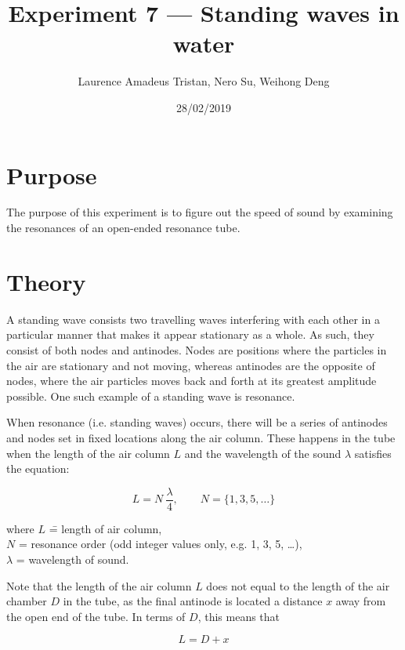 \documentclass{article}
\title{Experiment 7 — Standing waves in water}
\author{Laurence Amadeus Tristan, Nero Su, Weihong Deng}
\date{28/02/2019}
\numberwithin{equation}{section}
\begin{document}
\maketitle

\section{Purpose}
The purpose of this experiment is to figure out the speed of sound by examining the resonances of an open-ended resonance tube.

\section{Theory}
A standing wave consists two travelling waves interfering with each other in a particular manner that makes it appear stationary as a whole. As such, they consist of both nodes and antinodes. Nodes are positions where the particles in the air are stationary and not moving, whereas antinodes are the opposite of nodes, where the air particles moves back and forth at its greatest amplitude possible. One such example of a standing wave is resonance.

When resonance (i.e. standing waves) occurs, there will be a series of antinodes and nodes set in fixed locations along the air column.  These happens in the tube when the length of the air column \(L\) and the wavelength of the sound \(\lambda\) satisfies the equation:

\begin{equation} \label{eq:t1}
  L = N \ \frac{\lambda}{4}, \qquad N = \{1, 3, 5, \ldots\}
\end{equation}

\begin{tabbing}
  where \= \(L\) \= = length of air column, \\
  \> \(N\) \> = resonance order (odd integer values only, e.g. 1, 3, 5, \ldots), \\
  \> \(\lambda\) \> = wavelength of sound.
\end{tabbing}

Note that the length of the air column \(L\) does not equal to the length of the air chamber \(D\) in the tube, as the final antinode is located a distance \(x\) away from the open end of the tube. In terms of \(D\), this means that

\begin{equation} \label{eq:t2}
  L = D + x
\end{equation}
\end{document}
